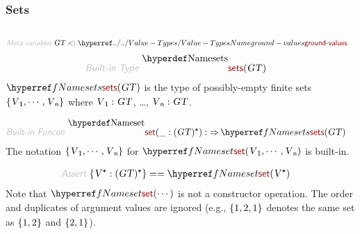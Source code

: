 \subsubsection*{Sets}\hypertarget{sets}{}\label{sets}

\begin{align*}
  [ ~ 
  \KEY{Type} ~ & \NAMEREF{sets} \\
  \KEY{Funcon} ~ & \NAMEREF{set} \\
  \KEY{Funcon} ~ & \NAMEREF{set-elements} \\
  \KEY{Funcon} ~ & \NAMEREF{is-in-set} \\
  \KEY{Funcon} ~ & \NAMEREF{is-subset} \\
  \KEY{Funcon} ~ & \NAMEREF{set-insert} \\
  \KEY{Funcon} ~ & \NAMEREF{set-unite} \\
  \KEY{Funcon} ~ & \NAMEREF{set-intersect} \\
  \KEY{Funcon} ~ & \NAMEREF{set-difference} \\
  \KEY{Funcon} ~ & \NAMEREF{set-size} \\
  \KEY{Funcon} ~ & \NAMEREF{some-element} \\
  \KEY{Funcon} ~ & \NAMEREF{element-not-in}
  ~ ]
\end{align*}
\begin{align*}
  \KEY{Meta-variables} ~ 
  & \VAR{GT} <: \NAMEHYPER{../..}{Value-Types}{ground-values}
\end{align*}
\begin{align*}
  \KEY{Built-in Type} ~  
  & \NAMEDECL{sets}(\VAR{GT} ) 
\end{align*}
$\SHADE{\NAMEREF{sets}
           ( \VAR{GT} )}$ is the type of possibly-empty finite sets $\SHADE{\{ \VAR{V}\SUB{1},  
            \cdots,  
            \VAR{V}\SUB{n} \}}$ 
  where $\SHADE{\VAR{V}\SUB{1} : \VAR{GT}}$, \ldots{}, $\SHADE{\VAR{V}\SUB{n} : \VAR{GT}}$.

\begin{align*}
  \KEY{Built-in Funcon} ~ 
  & \NAMEDECL{set}(\_ : ( \VAR{GT} )\STAR) :  \TO \NAMEREF{sets}
                                                                         ( \VAR{GT} )
\end{align*}
The notation $\SHADE{\{ \VAR{V}\SUB{1},  
            \cdots,  
            \VAR{V}\SUB{n} \}}$ for $\SHADE{\NAMEREF{set}
           ( \VAR{V}\SUB{1},   
             \cdots,   
             \VAR{V}\SUB{n} )}$ is built-in.

\begin{align*}
  \KEY{Assert} ~ 
  & \{ \VAR{V}\STAR : ( \VAR{GT} )\STAR \} == 
      \NAMEREF{set}
        ( \VAR{V}\STAR )
\end{align*}
Note that $\SHADE{\NAMEREF{set}
           ( \cdots )}$ is not a constructor operation. The order and duplicates
  of argument values are ignored (e.g., $\strut\{ 1,  
            2,  
            1 \}\strut$ denotes the same set as $\strut\{ 1,  
            2 \}\strut$ 
  and $\strut\{ 2,  
            1 \}\strut$).

